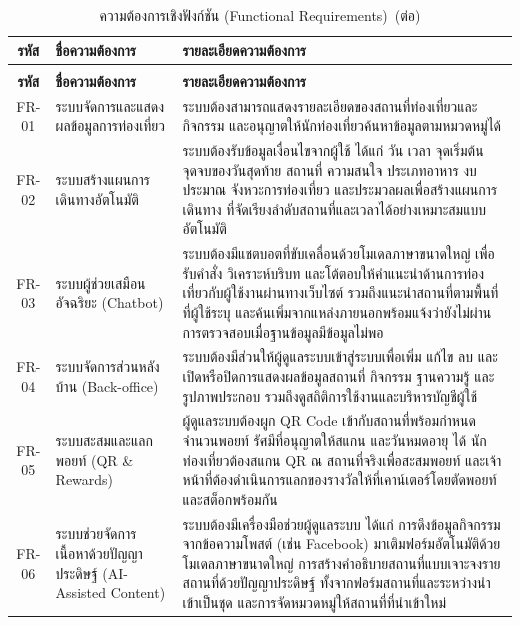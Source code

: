 \begin{longtable}{|c|p{4cm}|p{7cm}|}
\caption{ความต้องการเชิงฟังก์ชัน (Functional Requirements)}\label{tab:func_req}\\
\hline
\textbf{รหัส} & \textbf{ชื่อความต้องการ} & \textbf{รายละเอียดความต้องการ} \\
\hline
\endfirsthead
\caption[]{ความต้องการเชิงฟังก์ชัน (Functional Requirements)~(\textnormal{ต่อ})}\\
\hline
\textbf{รหัส} & \textbf{ชื่อความต้องการ} & \textbf{รายละเอียดความต้องการ} \\
\hline
\endhead
FR-01 & ระบบจัดการและแสดงผลข้อมูลการท่องเที่ยว & ระบบต้องสามารถแสดงรายละเอียดของสถานที่ท่องเที่ยวและกิจกรรม และอนุญาตให้นักท่องเที่ยวค้นหาข้อมูลตามหมวดหมู่ได้ \\ \hline
FR-02 & ระบบสร้างแผนการเดินทางอัตโนมัติ & ระบบต้องรับข้อมูลเงื่อนไขจากผู้ใช้ ได้แก่ วัน เวลา จุดเริ่มต้น จุดจบของวันสุดท้าย สถานที่ ความสนใจ ประเภทอาหาร งบประมาณ จังหวะการท่องเที่ยว และประมวลผลเพื่อสร้างแผนการเดินทาง ที่จัดเรียงลำดับสถานที่และเวลาได้อย่างเหมาะสมแบบอัตโนมัติ \\ \hline
FR-03 & ระบบผู้ช่วยเสมือนอัจฉริยะ (Chatbot) & ระบบต้องมีแชตบอตที่ขับเคลื่อนด้วยโมเดลภาษาขนาดใหญ่ เพื่อรับคำสั่ง วิเคราะห์บริบท และโต้ตอบให้คำแนะนำด้านการท่องเที่ยวกับผู้ใช้งานผ่านทางเว็บไซต์ รวมถึงแนะนำสถานที่ตามพื้นที่ที่ผู้ใช้ระบุ และค้นเพิ่มจากแหล่งภายนอกพร้อมแจ้งว่ายังไม่ผ่านการตรวจสอบเมื่อฐานข้อมูลมีข้อมูลไม่พอ \\ \hline
FR-04 & ระบบจัดการส่วนหลังบ้าน (Back-office) & ระบบต้องมีส่วนให้ผู้ดูแลระบบเข้าสู่ระบบเพื่อเพิ่ม แก้ไข ลบ และเปิดหรือปิดการแสดงผลข้อมูลสถานที่ กิจกรรม ฐานความรู้ และรูปภาพประกอบ รวมถึงดูสถิติการใช้งานและบริหารบัญชีผู้ใช้ \\ \hline
FR-05 & ระบบสะสมและแลกพอยท์ (QR \& Rewards) & ผู้ดูแลระบบต้องผูก QR Code เข้ากับสถานที่พร้อมกำหนดจำนวนพอยท์ รัศมีที่อนุญาตให้สแกน และวันหมดอายุ ได้ นักท่องเที่ยวต้องสแกน QR ณ สถานที่จริงเพื่อสะสมพอยท์ และเจ้าหน้าที่ต้องดำเนินการแลกของรางวัลให้ที่เคาน์เตอร์โดยตัดพอยท์และสต็อกพร้อมกัน \\ \hline
FR-06 & ระบบช่วยจัดการเนื้อหาด้วยปัญญาประดิษฐ์ (AI-Assisted Content) & ระบบต้องมีเครื่องมือช่วยผู้ดูแลระบบ ได้แก่ การดึงข้อมูลกิจกรรมจากข้อความโพสต์ (เช่น Facebook) มาเติมฟอร์มอัตโนมัติด้วยโมเดลภาษาขนาดใหญ่ การสร้างคำอธิบายสถานที่แบบเจาะจงรายสถานที่ด้วยปัญญาประดิษฐ์ ทั้งจากฟอร์มสถานที่และระหว่างนำเข้าเป็นชุด และการจัดหมวดหมู่ให้สถานที่ที่นำเข้าใหม่ \\ \hline

\end{longtable}
